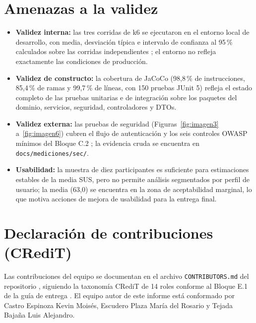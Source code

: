 \documentclass[12pt]{article}
\begin{document}
\section{Amenazas a la validez}

\begin{itemize}
    \item \textbf{Validez interna:} las tres corridas de k6 se ejecutaron en el entorno
    local de desarrollo, con media, desviación típica e intervalo de confianza al 95\,\%
    calculados sobre las corridas independientes \cite{uteq2026guia}; el entorno no refleja
    exactamente las condiciones de producción.
    \item \textbf{Validez de constructo:} la cobertura de JaCoCo (98{,}8\,\% de instrucciones,
    85{,}4\,\% de ramas y 99{,}7\,\% de líneas, con 150 pruebas JUnit 5) refleja el estado
    completo de las pruebas unitarias e de integración sobre los paquetes del dominio, servicios,
    seguridad, controladores y DTOs.
    \item \textbf{Validez externa:} las pruebas de seguridad (Figuras~\ref{fig:imagen3}
    a~\ref{fig:imagen6}) cubren el flujo de autenticación y los seis controles OWASP mínimos del
    Bloque C.2 \cite{owasp2021,uteq2026guia}; la evidencia cruda se encuentra en
    \texttt{docs/mediciones/sec/}.
    \item \textbf{Usabilidad:} la muestra de diez participantes es suficiente para estimaciones
    estables de la media SUS, pero no permite análisis segmentados por perfil de usuario; la media
    (63{,}0) se encuentra en la zona de aceptabilidad marginal, lo que motiva acciones de mejora
    de usabilidad para la entrega final.
\end{itemize}

\section*{Declaración de contribuciones (CRediT)}

Las contribuciones del equipo se documentan en el archivo \texttt{CONTRIBUTORS.md} del
repositorio \cite{sgroas_repo}, siguiendo la taxonomía CRediT de 14 roles conforme al
Bloque E.1 de la guía de entrega \cite{uteq2026guia}. El equipo autor de este informe está
conformado por Castro Espinoza Kevin Moisés, Escudero Plaza María del Rosario y Tejada Bajaña
Luis Alejandro.
\end{document}
